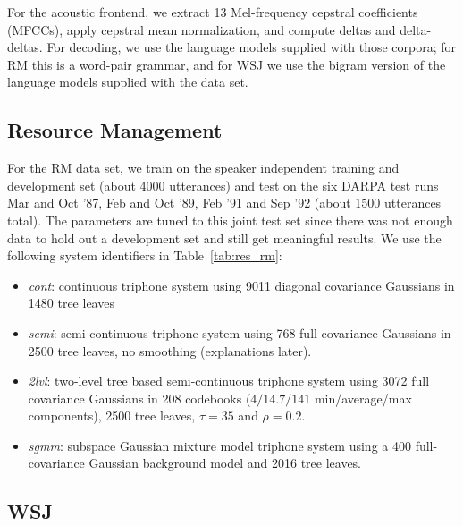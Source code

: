 \documentclass{article}
\begin{document}
For the acoustic frontend, we extract 13 Mel-frequency cepstral coefficients (MFCCs),
apply cepstral mean normalization, and compute deltas and delta-deltas.  For
decoding, we use the language models supplied with those corpora; for RM this
is a word-pair grammar, and for WSJ we use the bigram version of the language
models supplied with the data set.

\subsection{Resource Management}
For the RM data set, we train on the speaker independent training and development 
set (about 4000 utterances) and test on the six DARPA test runs Mar and Oct '87,
Feb and Oct '89, Feb '91 and Sep '92 (about 1500 utterances total).  The parameters 
are tuned to this joint test set since there was not enough data to hold out a
development set and still get meaningful results.
We use the following system identifiers in Table~\ref{tab:res_rm}:
%
\begin{itemize}
\item
  {\em cont}: continuous triphone system using 9011 diagonal covariance
  Gaussians in 1480 tree leaves
\item
  {\em semi}: semi-continuous triphone system using 768 full covariance
  Gaussians in 2500 tree leaves, no smoothing (explanations later).
\item
  {\em 2lvl}: two-level tree based semi-continuous triphone system using
  3072 full covariance Gaussians in 208 codebooks ($4/14.7/141$ min/average/max
  components), 2500 tree leaves, $\tau = 35$ and $\rho = 0.2$.
\item
  {\em sgmm}: subspace Gaussian mixture model triphone system using a 400 
  full-covariance Gaussian background model and 2016 tree leaves.
\end{itemize}

\subsection{WSJ}
\end{document}
